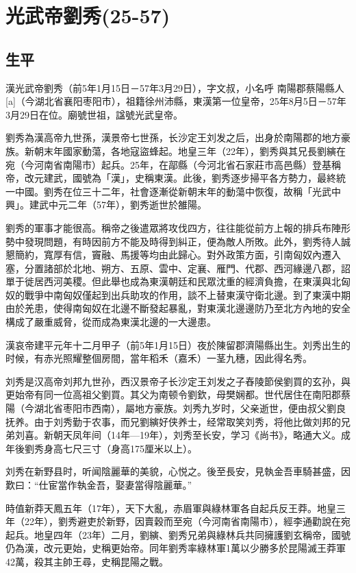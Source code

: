 
\section{光武帝劉秀\tiny(25-57)}

\subsection{生平}

漢光武帝劉秀（前5年1月15日－57年3月29日），字文叔，小名呼 南陽郡蔡陽縣人[a]（今湖北省襄阳枣阳市），祖籍徐州沛縣，東漢第一位皇帝，25年8月5日－57年3月29日在位。廟號世祖，諡號光武皇帝。

劉秀為漢高帝九世孫，漢景帝七世孫，长沙定王刘发之后，出身於南陽郡的地方豪族。新朝末年國家動蕩，各地寇盜蜂起。地皇三年（22年），劉秀與其兄長劉縯在宛（今河南省南陽市）起兵。25年，在鄗縣（今河北省石家莊市高邑縣）登基稱帝，改元建武，國號為「漢」，史稱東漢。此後，劉秀逐步掃平各方勢力，最終統一中國。劉秀在位三十二年，社會逐漸從新朝末年的動蕩中恢復，故稱「光武中興」。建武中元二年（57年），劉秀逝世於雒陽。

劉秀的軍事才能很高。稱帝之後遣眾將攻伐四方，往往能從前方上報的排兵布陣形勢中發現問題，有時因前方不能及時得到糾正，便為敵人所敗。此外，劉秀待人誠懇簡約，寬厚有信，竇融、馬援等均由此歸心。對外政策方面，引南匈奴內遷入塞，分置諸部於北地、朔方、五原、雲中、定襄、雁門、代郡、西河緣邊八郡，詔單于徙居西河美稷。但此舉也成為東漢朝廷和民眾沈重的經濟負擔，在東漢與北匈奴的戰爭中南匈奴僅起到出兵助攻的作用，談不上替東漢守衛北邊。到了東漢中期由於羌患，使得南匈奴在北邊不斷發起暴亂，對東漢北邊邊防乃至北方內地的安全構成了嚴重威脅，從而成為東漢北邊的一大邊患。

漢哀帝建平元年十二月甲子（前5年1月15日）夜於陳留郡濟陽縣出生。刘秀出生的时候，有赤光照耀整個房間，當年稻禾（嘉禾）一茎九穗，因此得名秀。

刘秀是汉高帝刘邦九世孙，西汉景帝子长沙定王刘发之子舂陵節侯劉買的玄孙，與更始帝有同一位高祖父劉買。其父为南顿令劉欽，母樊娴都。世代居住在南阳郡蔡陽（今湖北省枣阳市西南），屬地方豪族。刘秀九岁时，父亲逝世，便由叔父劉良抚养。由于刘秀勤于农事，而兄劉縯好侠养士，经常取笑刘秀，将他比做刘邦的兄弟刘喜。新朝天凤年间（14年—19年），刘秀至长安，学习《尚书》，略通大义。成年後劉秀身高七尺三寸（身高175厘米以上）。

刘秀在新野县时，听闻陰麗華的美貌，心悦之。後至長安，見執金吾車騎甚盛，因歎曰：“仕宦當作執金吾，娶妻當得陰麗華。”

時值新莽天鳳五年（17年），天下大亂，赤眉軍與綠林軍各自起兵反王莽。地皇三年（22年），劉秀避吏於新野，因賣穀而至宛（今河南省南陽市），經李通勸說在宛起兵。地皇四年（23年）二月，劉縯、劉秀兄弟與綠林兵共同擁護劉玄稱帝，國號仍為漢，改元更始，史稱更始帝。同年劉秀率綠林軍1萬以少勝多於昆陽滅王莽軍42萬，殺其主帥王尋，史稱昆陽之戰。

